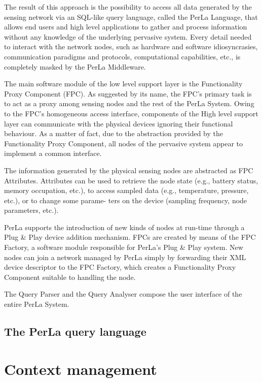 The result of this approach is the possibility to access all data generated by
the sensing network via an SQL-like query language, called the PerLa Language,
that allows end users and high level applications to gather and process
information without any knowledge of the underlying pervasive system. Every
detail needed to interact with the network nodes, such as hardware and software
idiosyncrasies, communication paradigms and protocols, computational
capabilities, etc., is completely masked by the PerLa Middleware.

The main software module of the low level support layer is the Functionality
Proxy Component (FPC). As suggested by its name, the FPC’s primary task is to
act as a proxy among sensing nodes and the rest of the PerLa System. Owing to
the FPC’s homogeneous access interface, components of the High level support
layer can communicate with the physical devices ignoring their functional
behaviour. As a matter of fact, due to the abstraction provided by the
Functionality Proxy Component, all nodes of the pervasive system appear to
implement a common interface.

The information generated by the physical sensing nodes are abstracted as FPC
Attributes. Attributes can be used to retrieve the node state (e.g., battery
status, memory occupation, etc.), to access sampled data (e.g., temperature,
pressure, etc.), or to change some parame- ters on the device (sampling
frequency, node parameters, etc.). 

PerLa supports the introduction of new
kinds of nodes at run-time through a Plug \& Play device addition mechanism.
FPCs are created by means of the FPC Factory, a software module responsible for
PerLa’s Plug \& Play system. New nodes can join a network managed by PerLa
simply by forwarding their XML device descriptor to the FPC Factory, which
creates a Functionality Proxy Component suitable to handling the node.

The Query Parser and the Query Analyser compose the user interface of the
entire PerLa System.

\subsection{The PerLa query language}

\section{Context management}

